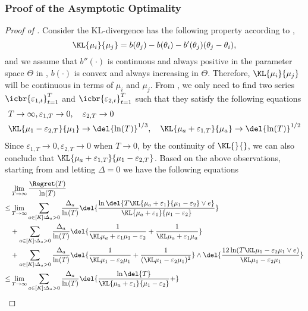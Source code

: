 \subsubsection{Proof of the Asymptotic Optimality}
\begin{proof}[Proof of ]
    Consider the KL-divergence has the following property according to ,
    \[
        \KL{\mu_i}{\mu_j} = b(\theta_j) - b(\theta_i) - b'(\theta_j)(\theta_j-\theta_i),
    \]
    and we assume that $b''(\cdot)$ is continuous and always positive in the parameter space $\Theta$ in , $b(\cdot)$ is convex and always increasing in $\Theta$.
    Therefore, $\KL{\mu_i}{\mu_j}$ will be continuous in terms of $\mu_i$ and $\mu_j$.
    From , we only need to find two series $\icbr{\varepsilon_{1,t}}_{t=1}^T$ and $\icbr{\varepsilon_{2,t}}_{t=1}^T$ such that they satisfy the following equations
    \begin{align*}
        & T \to \infty, \varepsilon_{1, T} \to 0, \quad
        \varepsilon_{2, T} \to 0
        \\
        & \KL{\mu_1-\varepsilon_{2,T}}{\mu_1} \to \del{\ln(T)}^{1/3},
        \quad
        \KL{\mu_a+\varepsilon_{1,T}}{\mu_a} \to \del{\ln(T)}^{1/2} \\
    \end{align*}
    Since $\varepsilon_{1, T} \to 0, \varepsilon_{2, T} \to 0$ when $T \to 0$, by the continuity of $\KL{}{}$, we can also conclude that $\KL{\mu_a+\varepsilon_{1, T}}{\mu_1-\varepsilon_{2, T}}$.
    Based on the above observations, starting from  and letting $\Delta = 0$ we have the following equations
    \begin{align*}
        & \lim_{T \to \infty} \frac{\Regret(T)}{\ln(T)} \\
        \leq&
        \lim_{T \to \infty}
        \sum_{a\in[K]:\Delta_a > 0} \frac{\Delta_a}{\ln(T)} \del{\frac{\ln\del{T\KL{\mu_a+\varepsilon_1}{\mu_1-\varepsilon_2} \vee e}}{\KL{\mu_a+\varepsilon_1}{\mu_1-\varepsilon_2}} }
        \\
        &+
        \sum_{a\in[K]:\Delta_a > 0} \frac{\Delta_a}{\ln(T)} \del{ \GoodEventBound + \ExpFTwo }
        \\
        &+
        \sum_{a\in[K]: \Delta_a > 0} \frac{\Delta_a}{\ln(T)} \del{\BadEventThreeBoundForAO} \wedge
        \del{\BadEventThreeBoundForMO}
        \\
        \leq& 
        \lim_{T \to \infty}
        \sum_{a\in[K]:\Delta_a > 0} \frac{\Delta_a}{\ln(T)} \del{\frac{\ln\del{T}}{\KL{\mu_a+\varepsilon_1}{\mu_1-\varepsilon_2}} +
}
\end{align*}
\end{proof}
